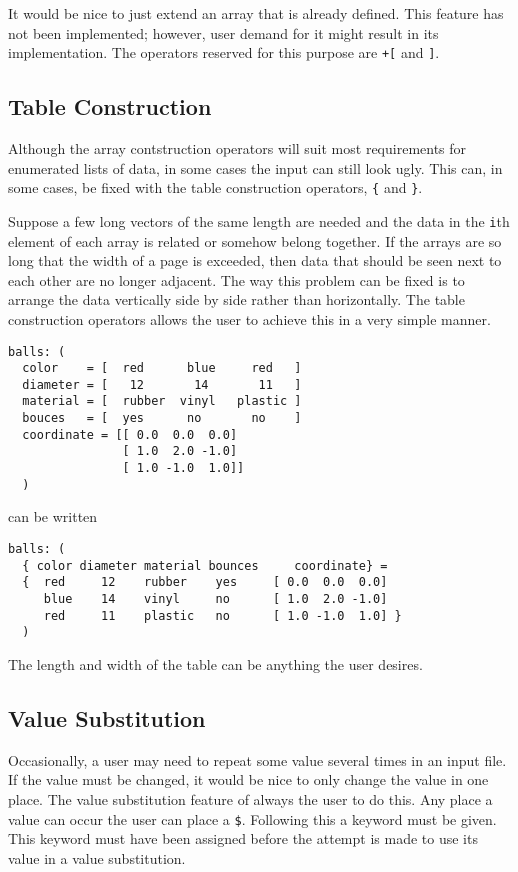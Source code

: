 It would be nice to just extend an array that is already defined.  This
feature has not been implemented; however, user demand for it might
result in its implementation.  The operators reserved for this purpose
are \verb|+[| and \verb|]|.

\subsection{Table Construction}

Although the array contstruction operators will suit most requirements
for enumerated lists of data, in some cases the input can still look
ugly.  This can, in some cases, be fixed with the table construction
operators, \verb|{| and \verb|}|.

Suppose a few long vectors of the same length are needed and the data in
the \verb|i|th element of each array is related or somehow belong
together.  If the arrays are so long that the width of a page is
exceeded, then data that should be seen next to each other are no longer
adjacent.  The way this problem can be fixed is to arrange the data
vertically side by side rather than horizontally.  The table
construction operators allows the user to achieve this in a very simple
manner.
\begin{verbatim}
balls: (
  color    = [  red      blue     red   ]
  diameter = [   12       14       11   ]
  material = [  rubber  vinyl   plastic ]
  bouces   = [  yes      no       no    ]
  coordinate = [[ 0.0  0.0  0.0]
                [ 1.0  2.0 -1.0]
                [ 1.0 -1.0  1.0]]
  )
\end{verbatim}
can be written
\begin{verbatim}
balls: (
  { color diameter material bounces     coordinate} =
  {  red     12    rubber    yes     [ 0.0  0.0  0.0]
     blue    14    vinyl     no      [ 1.0  2.0 -1.0]
     red     11    plastic   no      [ 1.0 -1.0  1.0] }
  )
\end{verbatim}
The length and width of the table can be anything the user desires.

\subsection{Value Substitution}
\label{ParsedKeyValvalsub}

Occasionally, a user may need to repeat some value several times in an
input file.  If the value must be changed, it would be nice to only
change the value in one place.  The value substitution feature of
 always the user to do this.  Any place a value can
occur the user can place a \verb|$|.  Following this a keyword must be
given.  This keyword must have been assigned before the attempt is made
to use its value in a value substitution.

